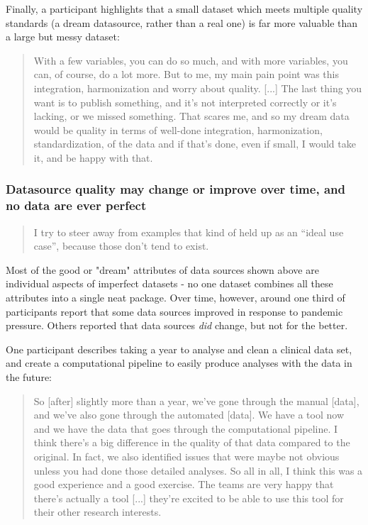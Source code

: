 \documentclass{CUP-JNL-DAP}%
\begin{document}
Finally, a participant highlights that a small dataset which meets multiple quality standards (a dream datasource, rather than a real one) is far more valuable than a large but messy dataset:

\blockquote{With a few variables, you can do so much, and with more variables, you can, of course, do a lot more. But to me, my main pain point was this integration, harmonization and worry about quality. [...] The last thing you want is to publish something, and it's not interpreted correctly or it's lacking, or we missed something. That scares me, and so my dream data would be quality in terms of well-done integration, harmonization, standardization, of the data and if that's done, even if small, I would take it, and be happy with that.}

\subsubsection{Datasource quality may change or improve over time, and no data are ever perfect}

\blockquote{I try to steer away from examples that kind of held up as an \enquote{ideal use case}, because those don't tend to exist.}

Most of the good or "dream" attributes of data sources shown above are individual aspects of imperfect datasets - no one dataset combines all these attributes into a single neat package. Over time, however, around one third of participants report that some data sources improved in response to pandemic pressure. Others reported that data sources \textit{did} change, but not for the better. 

One participant describes taking a year to analyse and clean a clinical data set, and create a computational pipeline to easily produce analyses with the data in the future: 

\blockquote{So [after] slightly more than a year, we've gone through the manual [data], and we've also gone through the automated [data]. We have a tool now and we have the data that goes through the computational pipeline. I think there's a big difference in the quality of that data compared to the original. In fact, we also identified issues that were maybe not obvious unless you had done those detailed analyses. So all in all, I think this was a good experience and a good exercise. The teams are very happy that there's actually a tool [...] they're excited to be able to use this tool for their other research interests.}
\end{document}
